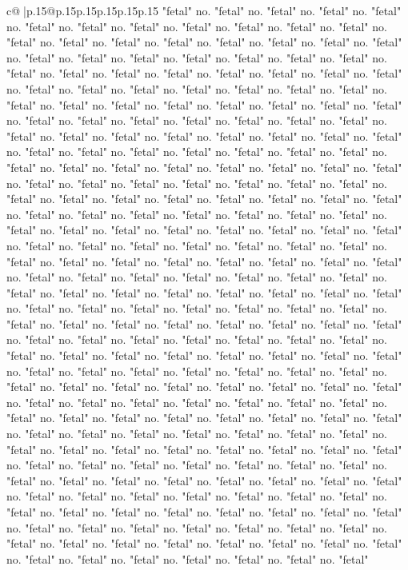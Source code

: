 \documentclass{article}
\begin{document}
{\begin{supertabular}{c@{$\;$}|p{.15\linewidth}@{}p{.15\linewidth}p{.15\linewidth}p{.15\linewidth}p{.15\linewidth}p{.15\linewidth}}
{{{"fetal" no. "fetal" no. "fetal" no. "fetal" no. "fetal" no. "fetal" no. "fetal" no. "fetal" no. "fetal" no. "fetal" no. "fetal" no. "fetal" no. "fetal" no. "fetal" no. "fetal" no. "fetal" no. "fetal" no. "fetal" no. "fetal" no. "fetal" no. "fetal" no. "fetal" no. "fetal" no. "fetal" no. "fetal" no. "fetal" no. "fetal" no. "fetal" no. "fetal" no. "fetal" no. "fetal" no. "fetal" no. "fetal" no. "fetal" no. "fetal" no. "fetal" no. "fetal" no. "fetal" no. "fetal" no. "fetal" no. "fetal" no. "fetal" no. "fetal" no. "fetal" no. "fetal" no. "fetal" no. "fetal" no. "fetal" no. "fetal" no. "fetal" no. "fetal" no. "fetal" no. "fetal" no. "fetal" no. "fetal" no. "fetal" no. "fetal" no. "fetal" no. "fetal" no. "fetal" no. "fetal" no. "fetal" no. "fetal" no. "fetal" no. "fetal" no. "fetal" no. "fetal" no. "fetal" no. "fetal" no. "fetal" no. "fetal" no. "fetal" no. "fetal" no. "fetal" no. "fetal" no. "fetal" no. "fetal" no. "fetal" no. "fetal" no. "fetal" no. "fetal" no. "fetal" no. "fetal" no. "fetal" no. "fetal" no. "fetal" no. "fetal" no. "fetal" no. "fetal" no. "fetal" no. "fetal" no. "fetal" no. "fetal" no. "fetal" no. "fetal" no. "fetal" no. "fetal" no. "fetal" no. "fetal" no. "fetal" no. "fetal" no. "fetal" no. "fetal" no. "fetal" no. "fetal" no. "fetal" no. "fetal" no. "fetal" no. "fetal" no. "fetal" no. "fetal" no. "fetal" no. "fetal" no. "fetal" no. "fetal" no. "fetal" no. "fetal" no. "fetal" no. "fetal" no. "fetal" no. "fetal" no. "fetal" no. "fetal" no. "fetal" no. "fetal" no. "fetal" no. "fetal" no. "fetal" no. "fetal" no. "fetal" no. "fetal" no. "fetal" no. "fetal" no. "fetal" no. "fetal" no. "fetal" no. "fetal" no. "fetal" no. "fetal" no. "fetal" no. "fetal" no. "fetal" no. "fetal" no. "fetal" no. "fetal" no. "fetal" no. "fetal" no. "fetal" no. "fetal" no. "fetal" no. "fetal" no. "fetal" no. "fetal" no. "fetal" no. "fetal" no. "fetal" no. "fetal" no. "fetal" no. "fetal" no. "fetal" no. "fetal" no. "fetal" no. "fetal" no. "fetal" no. "fetal" no. "fetal" no. "fetal" no. "fetal" no. "fetal" no. "fetal" no. "fetal" no. "fetal" no. "fetal" no. "fetal" no. "fetal" no. "fetal" no. "fetal" no. "fetal" no. "fetal" no. "fetal" no. "fetal" no. "fetal" no. "fetal" no. "fetal" no. "fetal" no. "fetal" no. "fetal" no. "fetal" no. "fetal" no. "fetal" no. "fetal" no. "fetal" no. "fetal" no. "fetal" no. "fetal" no. "fetal" no. "fetal" no. "fetal" no. "fetal" no. "fetal" no. "fetal" no. "fetal" no. "fetal" no. "fetal" no. "fetal" no. "fetal" no. "fetal" no. "fetal" no. "fetal" no. "fetal" no. "fetal" no. "fetal" no. "fetal" no. "fetal" no. "fetal" no. "fetal" no. "fetal" no. "fetal" no. "fetal" no. "fetal" no. "fetal" no. "fetal" no. "fetal" no. "fetal" no. "fetal" no. "fetal" no. "fetal" no. "fetal" no. "fetal" no. "fetal" no. "fetal" no. "fetal" no. "fetal" no. "fetal" no. "fetal" no. "fetal" no. "fetal" no. "fetal" no. "fetal" no. "fetal" no. "fetal" no. "fetal" no. "fetal" no. "fetal" no. "fetal" no. "fetal" no. "fetal" no. "fetal" no. "fetal" no. "fetal" no. "fetal" no. "fetal" no. "fetal" no. "fetal" no. "fetal" no. "fetal" no. "fetal" no. "fetal" no. "fetal" no. "fetal" no. "fetal" no. "fetal" no. "fetal" no. "fetal" no. "fetal" no. "fetal" no. "fetal" }}}
\end{supertabular}}
\end{document}
